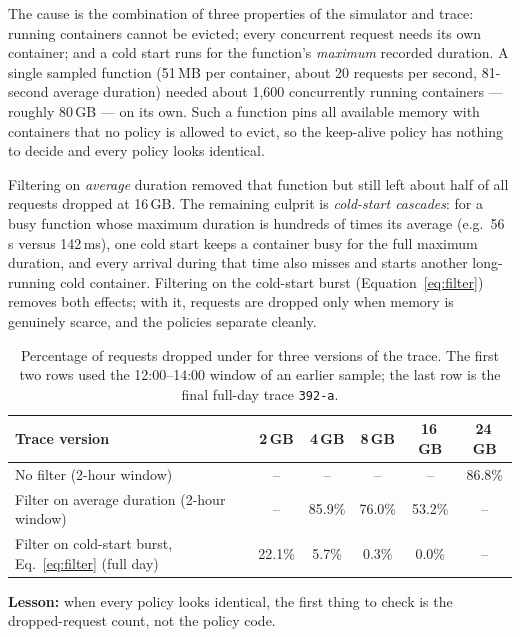 \documentclass[11pt,a4paper]{article}
\newcommand{\gd}{\text{GD}}
\newcommand{\code}[1]{\texttt{#1}}
\begin{document}
The cause is the combination of three properties of the simulator and trace: running
containers cannot be evicted; every concurrent request needs its own container; and a cold
start runs for the function's \emph{maximum} recorded duration. A single sampled function
(51\,MB per container, about 20 requests per second, 81-second average duration) needed about
1,600 concurrently running containers --- roughly 80\,GB --- on its own. Such a function pins
all available memory with containers that no policy is allowed to evict, so the keep-alive
policy has nothing to decide and every policy looks identical.

Filtering on \emph{average} duration removed that function but still left about half of all
requests dropped at 16\,GB. The remaining culprit is \emph{cold-start cascades}: for a busy
function whose maximum duration is hundreds of times its average (e.g.\ 56\,s versus 142\,ms),
one cold start keeps a container busy for the full maximum duration, and every arrival during
that time also misses and starts another long-running cold container. Filtering on the cold-start
burst (Equation~\eqref{eq:filter}) removes both effects; with it, requests are dropped only when
memory is genuinely scarce, and the policies separate cleanly.

\begin{table}[H]
\centering
\caption{Percentage of requests dropped under \gd{} for three versions of the trace.
The first two rows used the 12:00--14:00 window of an earlier sample; the last row is the
final full-day trace \code{392-a}.}
\label{tab:pathology}
\begin{tabular}{@{}lccccc@{}}
\toprule
\textbf{Trace version} & \textbf{2\,GB} & \textbf{4\,GB} & \textbf{8\,GB} & \textbf{16\,GB} & \textbf{24\,GB} \\
\midrule
No filter (2-hour window)                   & --      & --     & --     & --     & 86.8\% \\
Filter on average duration (2-hour window)  & --      & 85.9\% & 76.0\% & 53.2\% & -- \\
Filter on cold-start burst, Eq.~\eqref{eq:filter} (full day) & 22.1\% & 5.7\% & 0.3\% & 0.0\% & -- \\
\bottomrule
\end{tabular}
\end{table}

\textbf{Lesson:} when every policy looks identical, the first thing to check is the
dropped-request count, not the policy code.
\end{document}
